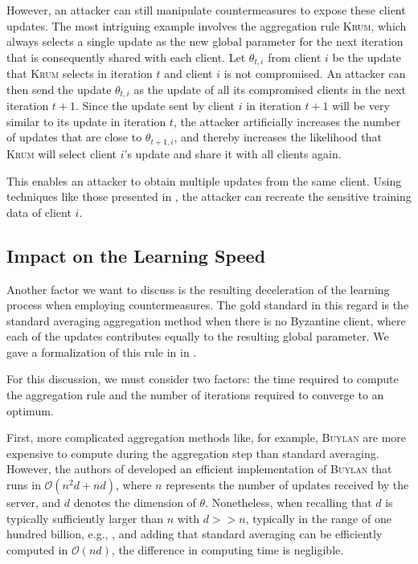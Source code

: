 \documentclass[conference]{IEEEtran}
\begin{document}
However, an attacker can still manipulate countermeasures to expose these client updates. The most intriguing example involves the aggregation rule \textsc{Krum}, which always selects a single update as the new global parameter for the next iteration that is consequently shared with each client. Let $\theta_{t,i}$ from client $i$ be the update that \textsc{Krum} selects in iteration $t$ and client $i$ is not compromised. An attacker can then send the update $\theta_{t,i}$ as the update of all its compromised clients in the next iteration $t+1$. Since the update sent by client $i$ in iteration $t+1$ will be very similar to its update in iteration $t$, the attacker artificially increases the number of updates that are close to $\theta_{t+1,i}$, and thereby increases the likelihood that \textsc{Krum} will select client $i$'s update and share it with all clients again.

This enables an attacker to obtain multiple updates from the same client. Using techniques like those presented in \cite{Zhu2020,Balunovic2022}, the attacker can recreate the sensitive training data of client $i$.
\subsection{Impact on the Learning Speed}
Another factor we want to discuss is the resulting deceleration of the learning process when employing countermeasures. The gold standard in this regard is the standard averaging aggregation method when there is no Byzantine client, where each of the updates contributes equally to the resulting global parameter. We gave a formalization of this rule in  in .

For this discussion, we must consider two factors: the time required to compute the aggregation rule and the number of iterations required to converge to an optimum.

First, more complicated aggregation methods like, for example, \textsc{Buylan} are more expensive to compute during the aggregation step than standard averaging. However, the authors of \cite{Mhamdi2018} developed an efficient implementation of \textsc{Buylan} that runs in $\mathcal{O}(n^2d +nd)$, where $n$ represents the number of updates received by the server, and $d$ denotes the dimension of $\theta$. Nonetheless, when recalling that $d$ is typically sufficiently larger than $n$ with $d >> n$, typically in the range of one hundred billion, e.g., \cite{Trask2015}, and adding that standard averaging can be efficiently computed in $\mathcal{O}(nd)$, the difference in computing time is negligible.
\end{document}
